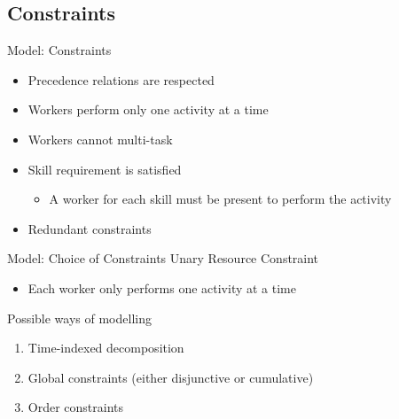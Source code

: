 \documentclass{beamer}
\begin{document}
\subsection{Constraints}
\begin{frame}{Model: Constraints}
	\begin{itemize}
		\item \pause Precedence relations are respected\pause
		\vspace{2mm}
		\item Workers perform only one activity at a time\pause
		\vspace{2mm}
		\item Workers cannot multi-task\pause
		\vspace{2mm}
		\item Skill requirement is satisfied
		\begin{itemize}
			\item A worker for each skill must be present to perform the activity\pause
		\end{itemize}
		\vspace{2mm}
		\item Redundant constraints
	\end{itemize}
\end{frame}

\begin{frame}{Model: Choice of Constraints}
	Unary Resource Constraint
	\vspace{1mm}
	\begin{itemize}
		\item Each worker only performs one activity at a time\pause
	\end{itemize}
	\vspace{5mm}
	Possible ways of modelling\pause
	\vspace{1mm}
	\begin{enumerate}
		\item Time-indexed decomposition\pause
		\vspace{1mm}
		\item Global constraints (either disjunctive or cumulative)\pause
		\vspace{1mm}
		\item Order constraints
	\end{enumerate}
\end{frame}
\end{document}

